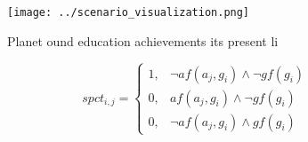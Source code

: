 \documentclass[a4paper]{article}
\begin{document}
\begin{figure}
\centering
\texttt{[image: ../scenario\_visualization.png]}
\caption{Planet ound education achievements its present li
}
\end{figure}
 
\begin{equation}
spct_{i,j} =
\begin{cases}
1, & \text{$\neg af(a_j,g_i) \wedge \neg gf(g_i)$}\\
0, & \text{$af(a_j,g_i) \wedge \neg gf(g_i)$}\\
0, & \text{$\neg af(a_j,g_i) \wedge gf(g_i)$}
\end{cases}
\end{equation}
\end{document}
